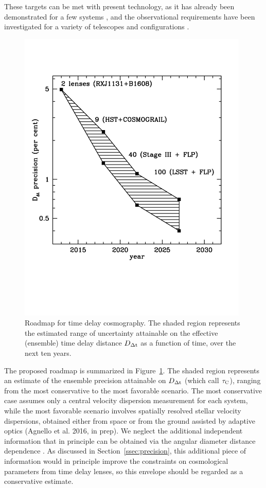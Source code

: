 These targets can be met with present technology, as it has already
been demonstrated for a few systems \citep{Tew++13,Suy++13}, and the
observational requirements have been investigated for a variety of
telescopes and configurations
\citep{Gre++13,CollettEtal2013,Men++15,Lin15}.

\begin{figure}
\includegraphics[width=0.98\textwidth]{figures/roadmap.pdf}
\caption{Roadmap for time delay cosmography. The shaded region
represents the estimated range of uncertainty attainable on the
effective (ensemble) time delay distance $D_{\Delta{\rm t}}$ as a
function of time, over the next ten years.}
\label{fig:roadmap}
\end{figure}

The proposed roadmap is summarized in Figure~\ref{fig:roadmap}. The
shaded region represents an estimate of the ensemble precision attainable on
$D_{\Delta{\rm t}}$ (which \citet{C+M09b} call $\mathcal{\tau}_{\rm C}$),
ranging from the most conservative to the most favorable
scenario. The most conservative case assumes only a central velocity
dispersion measurement for each system, while the most favorable
scenario involves spatially resolved stellar velocity dispersions,
obtained either from space or from the ground assisted by adaptive optics
(Agnello et al. 2016, in prep). We neglect the additional independent
information that in principle can be obtained via the angular
diameter distance dependence \citep{JeeEtal2016}.  As
discussed in Section~\ref{ssec:precision}, this additional piece of
information would in principle improve the constraints on cosmological
parameters from time delay lenses, so this envelope should be regarded
as a conservative estimate.

